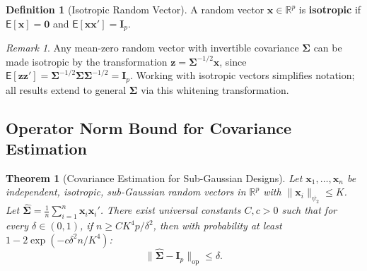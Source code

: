 \documentclass[14pt]{extarticle}
\theoremstyle{plain}
\newtheorem{theorem}{Theorem}[section]
\theoremstyle{definition}
\newtheorem{definition}{Definition}[section]
\theoremstyle{remark}
\newtheorem*{remark}{Remark}
\newcommand\expc{\mathsf{E}}
\newcommand{\bx}{\mathbf{x}}
\newcommand{\bI}{\mathbf{I}}
\newcommand{\bzero}{\mathbf{0}}
\newcommand{\bz}{\mathbf{z}}
\newcommand{\Real}{\mathbb{R}}
\newcommand{\bSigma}{\boldsymbol{\Sigma}}
\newcommand{\hbSigma}{\hat{\boldsymbol{\Sigma}}}
\newcommand{\opnorm}[1]{\|#1\|_{\mathrm{op}}}
\begin{document}
\begin{definition}[Isotropic Random Vector]\label{def:isotropic}
A random vector $\bx \in \Real^p$ is \textbf{isotropic} if $\expc[\bx] = \bzero$ and $\expc[\bx\bx'] = \bI_p$.
\end{definition}

\begin{remark}
Any mean-zero random vector with invertible covariance $\bSigma$ can be made isotropic by the transformation $\bz = \bSigma^{-1/2}\bx$, since $\expc[\bz\bz'] = \bSigma^{-1/2}\bSigma\bSigma^{-1/2} = \bI_p$. Working with isotropic vectors simplifies notation; all results extend to general $\bSigma$ via this whitening transformation.
\end{remark}

\subsection{Operator Norm Bound for Covariance Estimation}

\begin{theorem}[Covariance Estimation for Sub-Gaussian Designs]\label{thm:cov-estimation}
Let $\bx_1, \ldots, \bx_n$ be independent, isotropic, sub-Gaussian random vectors in $\Real^p$ with $\|\bx_i\|_{\psi_2} \leqslant K$. Let $\hbSigma = \frac{1}{n}\sum_{i=1}^n \bx_i\bx_i'$. There exist universal constants $C, c > 0$ such that for every $\delta \in (0, 1)$, if $n \geqslant CK^4 p/\delta^2$, then with probability at least $1 - 2\exp(-c\delta^2 n/K^4)$:
\begin{equation}\label{eq:cov-estimation}
\boxed{\opnorm{\hbSigma - \bI_p} \leqslant \delta.}
\end{equation}
\end{theorem}
\end{document}
